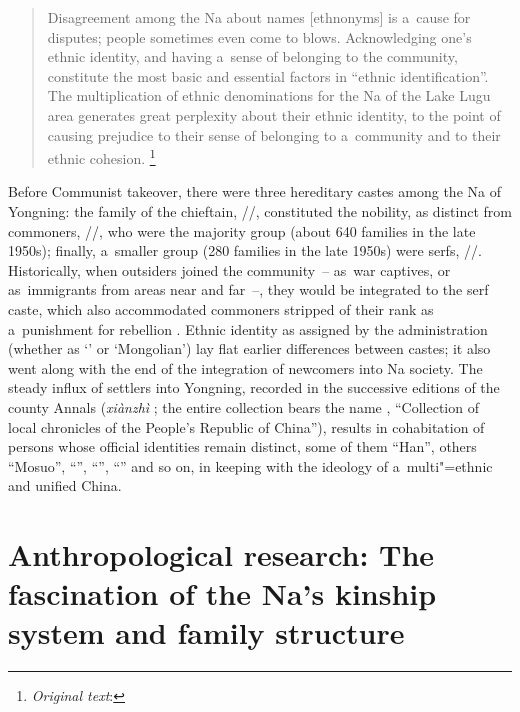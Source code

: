 \begin{quotation}
	Disagreement among the Na about names [ethnonyms] is a~cause for disputes; people sometimes even come to blows. Acknowledging one's ethnic identity, and having a~sense of belonging to the community, constitute the most basic and essential factors in “ethnic identification”. The multiplication of ethnic denominations for the Na of the Lake Lugu area generates great perplexity about their ethnic identity, to the point of causing prejudice to their sense of belonging to a~community and to their ethnic cohesion. \citep[53]{lamingying2015}\footnote{\textit{Original text}: }
\end{quotation}

Before Communist takeover, there were three hereditary castes among the Na of Yongning: the family of the chieftain, //, constituted the nobility, as distinct from commoners, //, who were the majority group (about 640 families in the late 1950s); finally, a~smaller group (280 families in the late 1950s) were serfs, //. Historically, when outsiders joined the community~-- as~war captives, or as~immigrants from areas near and far~--, they would be integrated to the serf caste, which also accommodated commoners stripped of their rank as a~punishment for rebellion \citep{liu1981}. Ethnic identity as assigned by the administration (whether as ‘’ or ‘Mongolian’) lay flat earlier differences between castes; it also went along with the end of the integration of newcomers into Na society. The steady influx of settlers into Yongning, recorded in the successive editions of
the county Annals (\textit{xiànzhì} ; the entire collection
bears the 
name {\kern-3pt}, “Collection of local chronicles of the People’s
Republic of China”), results in cohabitation of persons whose official identities remain distinct, some of them “Han”, others “Mosuo”, “”, “”, “” and so on, in keeping with the ideology of a~multi"=ethnic and unified China. 



\section[Anthropological research: The fascination of the Na family structure]{Anthropological research: The fascination of the Na's kinship system and family structure}
\label{sec:anthropologicalresearchthefascinationofnafamilystructure}

